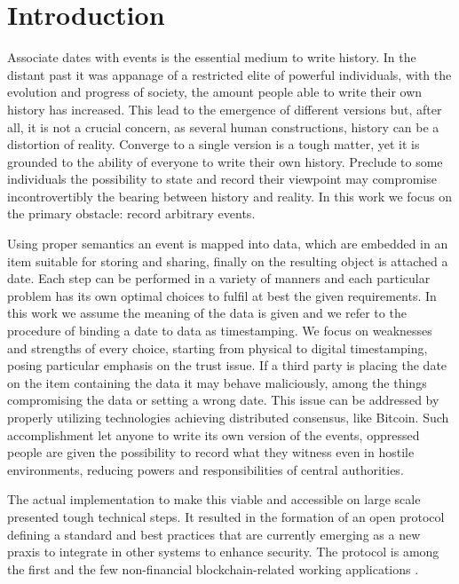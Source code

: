\chapter{Introduction}
\label{chpr:intro}
Associate dates with events is the essential medium to write history. 
In the distant past it was appanage of a restricted elite of powerful individuals, with the evolution and progress of society, the amount people able to write their own history has increased.
This lead to the emergence of different versions but, after all, it is not a crucial concern, as several human constructions, history can be a distortion of reality.
Converge to a single version is a tough matter, yet it is grounded to the ability of everyone to write their own history.
Preclude to some individuals the possibility to state and record their viewpoint may compromise incontrovertibly the bearing between history and reality.
In this work we focus on the primary obstacle: record arbitrary events.

Using proper semantics an event is mapped into data, which are embedded in an item suitable for storing and sharing, finally on the resulting object is attached a date. 
Each step can be performed in a variety of manners and each particular problem has its own optimal choices to fulfil at best the given requirements. 
In this work we assume the meaning of the data is given and we refer to the procedure of binding a date to data as timestamping. 
We focus on weaknesses and strengths of every choice, starting from physical to digital timestamping, posing particular emphasis on the trust issue.
If a third party is placing the date on the item containing the data it may behave maliciously, among the things compromising the data or setting a wrong date. This issue can be addressed by properly utilizing technologies achieving distributed consensus, like Bitcoin.
Such accomplishment let anyone to write its own version of the events, oppressed people are given the possibility to record what they witness even in hostile environments, reducing powers and responsibilities of central authorities.

The actual implementation to make this viable and accessible on large scale presented tough technical steps. 
It resulted in the formation of an open protocol defining a standard and best practices \cite{OTSWeb} that are currently emerging as a new praxis to integrate in other systems to enhance security. 
The protocol is among the first and the few non-financial blockchain-related working applications \cite{ESMAresponse}.

